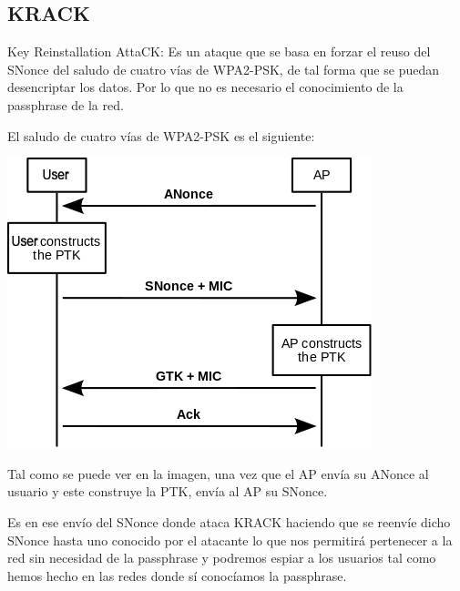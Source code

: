 \subsection{KRACK}
\hypertarget{krack}{}
Key Reinstallation AttaCK: Es un ataque que se basa en forzar el reuso del SNonce del saludo de cuatro vías de WPA2-PSK, de tal forma que se puedan desencriptar los datos. Por lo que no es necesario el conocimiento de la passphrase de la red.

El saludo de cuatro vías de WPA2-PSK es el siguiente:
\begin{center}
	\includegraphics[scale=0.7]{Saludo4vias.png}
\end{center}
Tal como se puede ver en la imagen, una vez que el AP envía su ANonce al usuario y este construye la PTK, envía al AP su SNonce.

Es en ese envío del SNonce donde ataca KRACK haciendo que se reenvíe dicho SNonce hasta uno conocido por el atacante lo que nos permitirá pertenecer a la red sin necesidad de la passphrase y podremos espiar a los usuarios tal como hemos hecho en las redes donde sí conocíamos la passphrase.

